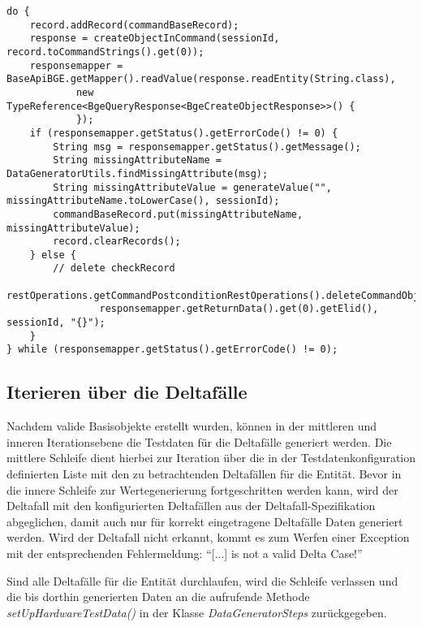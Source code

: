 \begin{lstlisting}[caption=Vorgehen zum Vervollständigen des \textit{Command}-Basisobjekts, label=commandBaseRecord,style=Javastyle]
do {
    record.addRecord(commandBaseRecord);
    response = createObjectInCommand(sessionId, record.toCommandStrings().get(0));
    responsemapper = BaseApiBGE.getMapper().readValue(response.readEntity(String.class),
            new TypeReference<BgeQueryResponse<BgeCreateObjectResponse>>() {
            });
    if (responsemapper.getStatus().getErrorCode() != 0) {
        String msg = responsemapper.getStatus().getMessage();
        String missingAttributeName = DataGeneratorUtils.findMissingAttribute(msg);
        String missingAttributeValue = generateValue("", missingAttributeName.toLowerCase(), sessionId);
        commandBaseRecord.put(missingAttributeName, missingAttributeValue);
        record.clearRecords();
    } else {
        // delete checkRecord
        restOperations.getCommandPostconditionRestOperations().deleteCommandObject(this.entityId,
                responsemapper.getReturnData().get(0).getElid(), sessionId, "{}");
    }
} while (responsemapper.getStatus().getErrorCode() != 0);
\end{lstlisting}

\subsection{Iterieren über die Deltafälle}\label{subsec:iterationDeltacases}
Nachdem valide Basisobjekte erstellt wurden, können in der mittleren und inneren Iterationsebene die Testdaten für die Deltafälle generiert werden. Die mittlere Schleife dient hierbei zur Iteration über die in der Testdatenkonfiguration definierten Liste mit den zu betrachtenden Deltafällen für die Entität. Bevor in die innere Schleife zur Wertegenerierung fortgeschritten werden kann, wird der Deltafall mit den konfigurierten Deltafällen aus der Deltafall-Spezifikation abgeglichen, damit auch nur für korrekt eingetragene Deltafälle Daten generiert werden. Wird der Deltafall nicht erkannt, kommt es zum Werfen einer Exception mit der entsprechenden Fehlermeldung: \enquote{[...] is not a valid Delta Case!}

Sind alle Deltafälle für die Entität durchlaufen, wird die Schleife verlassen und die bis dorthin generierten Daten an die aufrufende Methode \textit{setUpHardwareTestData()} in der Klasse \textit{DataGeneratorSteps} zurückgegeben.

